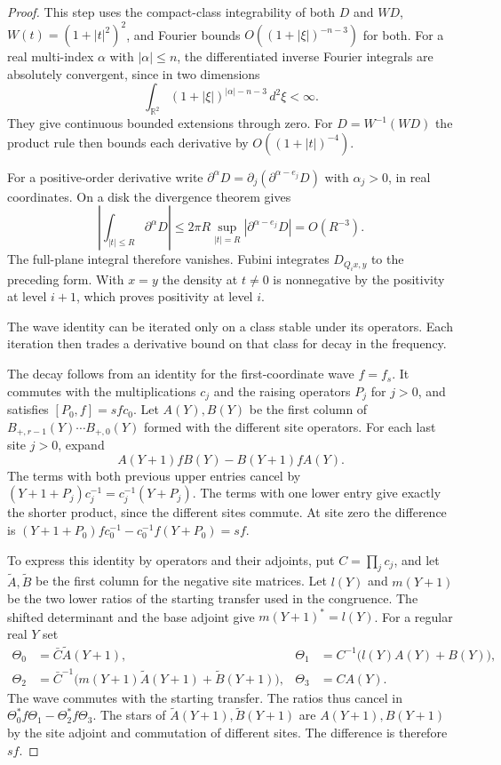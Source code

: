 \begin{proof}

This step uses the compact-class integrability
of both \(D\) and \(W D\), \(W(t)=(1+|t|^2)^2\), and
Fourier bounds \(O((1+|\xi|)^{-n-3})\) for both.
For a real multi-index \(\alpha\) with \(|\alpha|\le n\),
the differentiated inverse Fourier integrals are absolutely
convergent, since in two dimensions
\[
       \int_{\mathbb R^2}
            (1+|\xi|)^{|\alpha|-n-3}\,d^2\xi<\infty .
\]
They give continuous bounded extensions through zero. For
\(D=W^{-1}(WD)\) the product rule then bounds each derivative
by \(O((1+|t|)^{-4})\).

For a positive-order derivative write
\(\partial^\alpha D=\partial_j(\partial^{\alpha-e_j}D)\) with \(\alpha_j>0\), in real coordinates. On a disk the divergence theorem gives
\[
 \left|\int_{|t|\le R}\partial^\alpha D\right|
 \le 2\pi R \sup_{|t|=R}|\partial^{\alpha-e_j}D|=O(R^{-3}).
\]
The full-plane integral therefore vanishes. Fubini integrates
\(D_{Q_i x,y}\) to the preceding form. With \(x=y\) the
density at \(t\ne0\) is nonnegative by the positivity
at level \(i+1\), which proves positivity at level
\(i\).


The wave identity can be iterated only on a class stable under its operators. Each iteration then trades a derivative bound on that class for decay in the frequency.


The decay follows from an identity for the first-coordinate
wave \(f=f_s\). It commutes with the multiplications \(c_j\)
and the raising operators \(P_j\) for \(j>0\), and satisfies
\([P_0,f]=s f c_0\). Let \(A(Y),B(Y)\) be the first column
of \(B_{+,r-1}(Y)\cdots B_{+,0}(Y)\) formed with the
different site operators. For each last site \(j>0\), expand
\[
 A(Y+1)fB(Y)-B(Y+1)fA(Y).
\]
The terms with both previous upper entries cancel by
\((Y+1+P_j)c_j^{-1}=c_j^{-1}(Y+P_j)\).
The terms with one lower entry give exactly the shorter
product, since the different sites commute. At site zero the
difference is
\((Y+1+P_0)fc_0^{-1}-c_0^{-1}f(Y+P_0)=s f\).

To express this identity by operators and their adjoints, put
\(C=\prod_j c_j\), and let \(\tilde A,\tilde B\) be the
first column for the negative site matrices. Let \(l(Y)\) and
\(m(Y+1)\) be the two lower ratios of the starting transfer
used in the congruence. The shifted determinant and the
base adjoint give \(m(Y+1)^*=l(Y)\). For a regular real \(Y\)
set
\begin{align*}
 \Theta_0&=\bar C\tilde A(Y+1),&
 \Theta_1&=C^{-1}\big(l(Y)A(Y)+B(Y)\big),\\
 \Theta_2&=\bar C^{-1}
       \big(m(Y+1)\tilde A(Y+1)+\tilde B(Y+1)\big),&
 \Theta_3&=C A(Y).
\end{align*}
The wave commutes with the starting transfer.
The ratios thus cancel in
\(\Theta_0^* f\Theta_1-\Theta_2^* f\Theta_3\).
The stars of \(\tilde A(Y+1),\tilde B(Y+1)\) are
\(A(Y+1),B(Y+1)\) by the site adjoint and commutation of
different sites. The difference is therefore \(s f\).


\end{proof}
